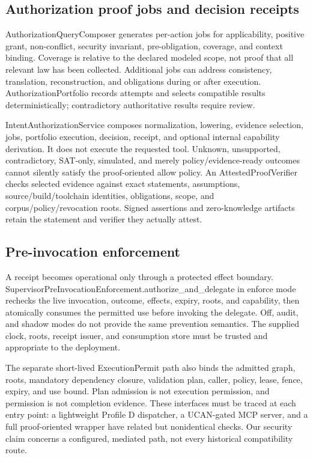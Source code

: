 \documentclass{article}
\begin{document}
\subsection{Authorization proof jobs and decision receipts}

AuthorizationQueryComposer generates per-action jobs for applicability, positive grant, non-conflict, security invariant, pre-obligation, coverage, and context binding. Coverage is relative to the declared modeled scope, not proof that all relevant law has been collected. Additional jobs can address consistency, translation, reconstruction, and obligations during or after execution. AuthorizationPortfolio records attempts and selects compatible results deterministically; contradictory authoritative results require review.

IntentAuthorizationService composes normalization, lowering, evidence selection, jobs, portfolio execution, decision, receipt, and optional internal capability derivation. It does not execute the requested tool. Unknown, unsupported, contradictory, SAT-only, simulated, and merely policy/evidence-ready outcomes cannot silently satisfy the proof-oriented allow policy. An AttestedProofVerifier checks selected evidence against exact statements, assumptions, source/build/toolchain identities, obligations, scope, and corpus/policy/revocation roots. Signed assertions and zero-knowledge artifacts retain the statement and verifier they actually attest.

\subsection{Pre-invocation enforcement}

A receipt becomes operational only through a protected effect boundary. SupervisorPreInvocationEnforcement.authorize\_\allowbreak{}and\_\allowbreak{}delegate in enforce mode rechecks the live invocation, outcome, effects, expiry, roots, and capability, then atomically consumes the permitted use before invoking the delegate. Off, audit, and shadow modes do not provide the same prevention semantics. The supplied clock, roots, receipt issuer, and consumption store must be trusted and appropriate to the deployment.

The separate short-lived ExecutionPermit path also binds the admitted graph, roots, mandatory dependency closure, validation plan, caller, policy, lease, fence, expiry, and use bound. Plan admission is not execution permission, and permission is not completion evidence. These interfaces must be traced at each entry point: a lightweight Profile D dispatcher, a UCAN-gated MCP server, and a full proof-oriented wrapper have related but nonidentical checks. Our security claim concerns a configured, mediated path, not every historical compatibility route.
\end{document}

